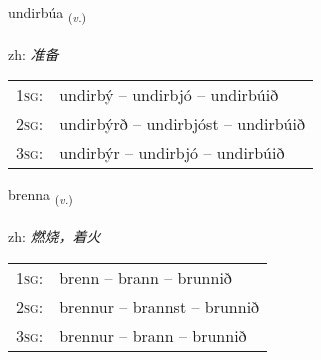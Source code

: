 \documentclass[frontgrid, backgrid]{flacards}\usepackage[]{graphicx}\usepackage[]{color}
\begin{document}
\renewcommand{\blhead}{\vskip5pt {\small\bfseries\footnotesize Sagnorð | 动词 }}
\renewcommand{\bcfoot}{\vskip5pt \hspace{2pt}{\small\bfseries\footnotesize 2K}}


{undirbúa \small{\textsubscript{(\textit{v.})}} \\[1ex] %
 \\
zh: \emph{准备} \\  [2ex]
\renewcommand*{\arraystretch}{0.8}
\begin{tabular}{p{1cm}l}
\textsc{1sg}: & undirbý -- undirbjó -- undirbúið \\ 
\textsc{2sg}: & undirbýrð -- undirbjóst -- undirbúið \\ 
\textsc{3sg}: & undirbýr -- undirbjó -- undirbúið \\ 
\end{tabular}
}

\renewcommand{\flhead}{\vskip5pt \fboxsep=0pt {\small\bfseries\footnotesize Sagnorð | 动词}}
\renewcommand{\fcfoot}{\vskip5pt \fboxsep=0pt \hspace{2pt}{\small\bfseries\footnotesize 2K}}

\renewcommand{\blhead}{\vskip5pt {\small\bfseries\footnotesize Sagnorð | 动词 }}
\renewcommand{\bcfoot}{\vskip5pt \hspace{2pt}{\small\bfseries\footnotesize 2K}}


{brenna \small{\textsubscript{(\textit{v.})}} \\[1ex] %
\textphonetic{[prɛna]} \\
zh: \emph{燃烧，着火} \\  [2ex]
\renewcommand*{\arraystretch}{0.8}
\begin{tabular}{p{1cm}l}
\textsc{1sg}: & brenn -- brann -- brunnið \\ 
\textsc{2sg}: & brennur -- brannst -- brunnið \\ 
\textsc{3sg}: & brennur -- brann -- brunnið \\ 
\end{tabular}
}
\end{document}
